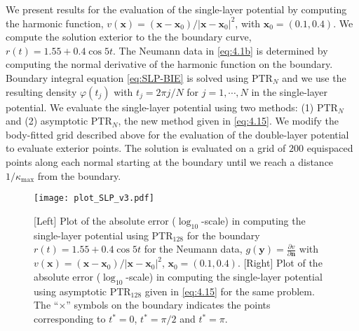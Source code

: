 \documentclass{article}[12pt]
\numberwithin{equation}{section}
\begin{document}
We present results for the evaluation of the single-layer potential by
computing the harmonic function,
$v(\mathbf{x}) = ( \mathbf{x} - \mathbf{x}_{0} ) / | \mathbf{x} -
\mathbf{x}_{0} |^{2}$,
with $\mathbf{x}_0 = (0.1,0.4)$.  We compute the solution exterior to
the the boundary curve, $r(t) = 1.55 + 0.4 \cos 5 t$.  The Neumann
data in \eqref{eq:4.1b} is determined by computing the normal
derivative of the harmonic function on the boundary.  Boundary
integral equation \eqref{eq:SLP-BIE} is solved using
PTR$_{N}$ and we use the resulting density
$\varphi(t_{j})$ with $t_{j} = 2\pi j/N$ for $j = 1, \cdots, N$ in the
single-layer potential. We evaluate the single-layer potential using
two methods: (1) PTR$_{N}$ and (2) asymptotic
PTR$_{N}$, the new method given in \eqref{eq:4.15}.
We modify the body-fitted grid described above for the evaluation of
the double-layer potential to evaluate exterior points.  The solution
is evaluated on a grid of $200$ equispaced points along each normal
starting at the boundary until we reach a distance $1/\kappa_{\max}$
from the boundary.

\begin{figure}[h!]
  \centering
  \texttt{[image: plot\_SLP\_v3.pdf]}  
  \caption{[Left] Plot of the absolute error
      ($\log_{10}$-scale) in computing the single-layer potential
      using PTR$_{128}$ for the boundary
    $r(t) = {1.55 + 0.4 \cos 5 t }$ for the Neumann data,
    $g(\mathbf{y}) = \frac{\partial v}{\partial \mathbf{n}}$ with
    $v(\mathbf{x}) = ( \mathbf{x} - \mathbf{x}_{0} ) / | \mathbf{x} -
    \mathbf{x}_{0} |^{2}$,
    $\mathbf{x}_{0} = {(0.1, 0.4)}$.  [Right] Plot of the absolute
    error ($\log_{10}$-scale) in computing the
      single-layer potential using asymptotic PTR$_{128}$ given in
    \eqref{eq:4.15} for the same problem. The ``$\times$'' symbols on
    the boundary indicates the points corresponding to $t^{\ast}=0$,
    $t^{\ast}=\pi/2$ and $t^{\ast}=\pi$. }
  \label{fig:8}
\end{figure}
\end{document}
